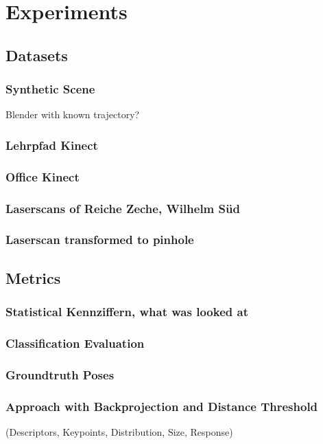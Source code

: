 \section{Experiments}

\subsection{Datasets}
\subsubsection{Synthetic Scene}
Blender with known trajectory?
\subsubsection{Lehrpfad Kinect}
\subsubsection{Office Kinect}
\subsubsection{Laserscans of Reiche Zeche, Wilhelm Süd}
\subsubsection{Laserscan transformed to pinhole}

\subsection{Metrics}

\subsubsection{Statistical Kennziffern, what was looked at}
\subsubsection{Classification Evaluation}
\subsubsection{Groundtruth Poses}
\subsubsection{Approach with Backprojection and Distance Threshold}
(Descriptors, Keypoints, Distribution, Size, Response)

